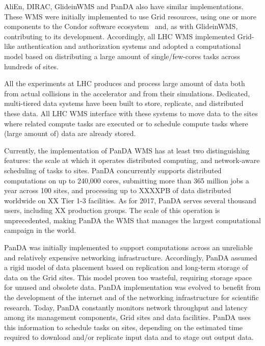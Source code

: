 AliEn, DIRAC, GlideinWMS and PanDA also have similar implementations. These WMS
were initially implemented to use Grid resources, using one or more components
to the Condor software ecosystem~\cite{thain2005distributed} and, as with
GlideinWMS, contributing to its development. Accordingly, all LHC WMS
implemented Grid-like authentication and authorization systems and adopted a
computational model based on distributing a large amount of single/few-cores
tasks across hundreds of sites.

All the experiments at LHC produces and process large amount of data both from
actual collisions in the accelerator and from their simulations. Dedicated,
multi-tiered data systems have been built to store, replicate, and distributed
these data. All LHC WMS interface with these systems to move data to the sites
where related compute tasks are executed or to schedule compute tasks where
(large amount of) data are already stored.

Currently, the implementation of PanDA WMS has at least two distinguishing
features: the scale at which it operates distributed computing, and
network-aware scheduling of tasks to sites. PanDA concurrently supports distributed
computations on up to 240,000 cores, submitting more than 365 million jobs a
year across 100 sites, and processing up to XXXXPB of data distributed worldwide
on XX Tier 1-3 facilities. As for 2017, PanDA serves several thousand users,
including XX production groups. The scale of this operation is unprecedented,
making PanDA the WMS that manages the largest computational campaign in the
world.

PanDA was initially implemented to support computations across an unreliable and
relatively expensive networking infrastructure. Accordingly, PanDA assumed a
rigid model of data placement based on replication and long-term storage of data
on the Grid sites. This model proven too wasteful, requiring storage space for
unused and obsolete data. PanDA implementation was evolved to benefit from the
development of the internet and of the networking infrastructure for scientific
research. Today, PanDA constantly monitors network throughput and latency among
its management components, Grid sites and data facilities. PanDA uses this
information to schedule tasks on sites, depending on the estimated time required
to download and/or replicate input data and to stage out output data.


